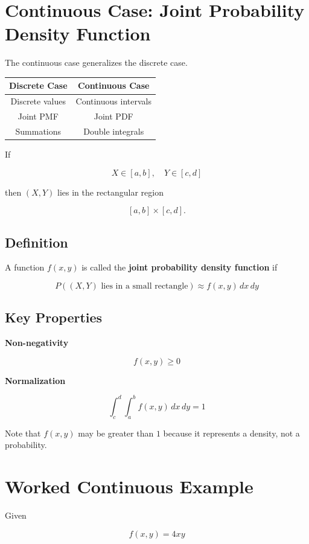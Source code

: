 \documentclass[12pt]{article}
\begin{document}
\section{Continuous Case: Joint Probability Density Function}

The continuous case generalizes the discrete case.

\begin{center}
\begin{tabular}{c|c}
Discrete Case & Continuous Case \\
\hline
Discrete values & Continuous intervals \\
Joint PMF & Joint PDF \\
Summations & Double integrals \\
\end{tabular}
\end{center}

If

\[
X \in [a,b], \quad Y \in [c,d]
\]

then $(X,Y)$ lies in the rectangular region

\[
[a,b] \times [c,d].
\]

\subsection{Definition}

A function $f(x,y)$ is called the \textbf{joint probability density function} if

\[
P((X,Y) \text{ lies in a small rectangle}) \approx f(x,y)\,dx\,dy
\]

\subsection{Key Properties}

\textbf{Non-negativity}

\[
f(x,y) \ge 0
\]

\textbf{Normalization}

\[
\int_c^d \int_a^b f(x,y)\,dx\,dy = 1
\]

Note that $f(x,y)$ may be greater than $1$ because it represents a density, not a probability.

\section{Worked Continuous Example}

Given

\[
f(x,y) = 4xy
\]
\end{document}
